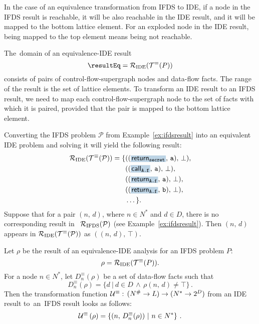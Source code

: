 {In the case of an equivalence transformation from IFDS to IDE, if a node in the IFDS result is reachable, it will be also reachable in the IDE result, and it will be mapped to the bottom lattice element. For an exploded node in the IDE result, being mapped to the top element means being not reachable.

The~domain of an equivalence-IDE result 
\begin{equation}
  \resultEq=\resultIDE(\transEq(P))
\end{equation}
consists of pairs of control-flow-supergraph nodes and data-flow facts. The range of the result is the set of lattice elements. To transform an IDE result to an IFDS result, we need to map each control-flow-supergraph node to the set of facts with which it is paired, provided that the pair is mapped to the bottom lattice element.

\begin{mdelete}
\begin{example}\label{ex:ideresult}
  Converting the IFDS problem $\mathcal P$ from Example~\ref{ex:ifdsresult} into an equivalent IDE problem and solving it will yield the following result:
    \small\begin{align*}
    \resultIDE(\transEq(\mathcal P))=\{&((\highlight{\textsf{return}_\texttt{secret}}{greyblue},\,\texttt a),\,\bot),\\
      &((\highlight{\textsf{call}_\texttt{A.f}}{greyblue},\,\texttt a),\,\bot),\\
      &((\highlight{\textsf{return}_\texttt{A.f}}{greyblue},\,\texttt a),\,\bot),\\
      &((\highlight{\textsf{return}_\texttt{A.f}}{greyblue},\,\texttt b),\,\bot),\\
      &\dots\}.\\
    \end{align*}\normalsize
  Suppose that for a pair $(n,\,d)$, where $n\in N^*$ and $d\in D$, there is no corresponding result in ~$\mathcal R_{\text{IFDS}}(\mathcal P)$ (see Example~\ref{ex:ifdsresult}). Then $(n,\,d)$ appears in $\mathcal R_{\text{IDE}}(\mathcal T^\equiv(\mathcal P))$ as $((n,\,d),\,\top)$.
\end{example}
\end{mdelete}

Let $\rho$ be the result of an equivalence-IDE analysis for an IFDS problem $P$:
\[
  \rho=\mathcal R_{\text{IDE}}(\mathcal T^\equiv(P)).
\]
For a node $n\in N^*$, let $D_n^\equiv(\rho)$ be a set of data-flow facts such that
\begin{equation}
  D_n^\equiv(\rho)=\{d\ |\ d\in D\,\wedge\,\rho(n,\,d)\ne\top\}\,.
\end{equation}
Then the transformation function
$\mathcal U^\equiv:\,(N^\#\to L)\to(N^*\to2^D)$
from an IDE result to~an~IFDS result looks as follows:
\begin{equation}
  \mathcal U^\equiv\left(\rho\right)=
    \left\{(n,\,D_n^\equiv(\rho))\ |\ n\in N^*\right\}\,.
\end{equation}

}
